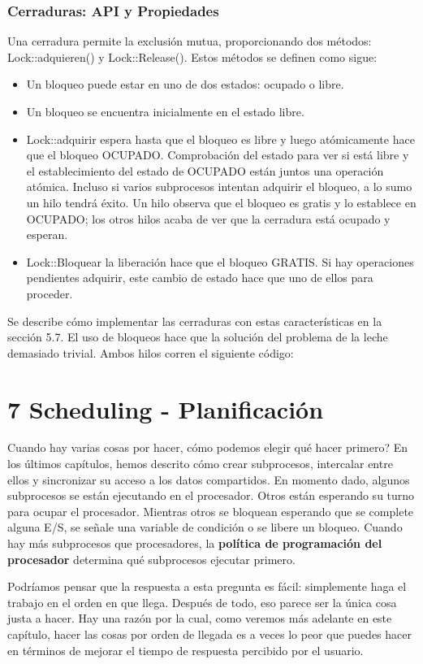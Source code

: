 \documentclass[10pt]{book}
\begin{document}
\subsection{Cerraduras: API y Propiedades}
Una cerradura permite la exclusión mutua, proporcionando dos métodos: Lock::adquieren() y Lock::Release(). Estos métodos se definen como sigue:
\begin{itemize}
\item Un bloqueo puede estar en uno de dos estados: ocupado o libre.
\item Un bloqueo se encuentra inicialmente en el estado libre.
\item Lock::adquirir espera hasta que el bloqueo es libre y luego atómicamente hace que el bloqueo OCUPADO. Comprobación del estado para ver si está libre y el establecimiento del estado de OCUPADO están juntos una operación atómica. Incluso si varios subprocesos intentan adquirir el bloqueo, a lo sumo un hilo tendrá éxito. Un hilo observa que el bloqueo es gratis y lo establece en OCUPADO; los otros hilos acaba de ver que la cerradura está ocupado y esperan.
\item Lock::Bloquear la liberación hace que el bloqueo GRATIS. Si hay operaciones pendientes adquirir, este cambio de estado hace que uno de ellos para proceder.
\end{itemize}

Se describe cómo implementar las cerraduras con estas características en la sección 5.7. El uso de bloqueos hace que la solución del problema de la leche demasiado trivial. Ambos hilos corren el siguiente código:


\chapter{ 7 Scheduling - Planificación}
Cuando hay varias cosas por hacer, cómo podemos elegir qué hacer primero? En los últimos capítulos, hemos descrito cómo crear subprocesos, intercalar entre ellos y sincronizar su acceso a los datos compartidos. En momento dado, algunos subprocesos se están ejecutando en el procesador. Otros están esperando su turno para ocupar el procesador. Mientras otros se bloquean esperando que se complete alguna E/S, se señale una variable de condición o se libere un bloqueo. Cuando hay más subprocesos que procesadores, la \textbf{política de programación del procesador} determina qué subprocesos ejecutar primero.

Podríamos pensar que la respuesta a esta pregunta es fácil: simplemente haga el trabajo en el orden en que llega. Después de todo, eso parece ser la única cosa justa a hacer. Hay una razón por la cual, como veremos más adelante en este capítulo, hacer las cosas por orden de llegada es a veces lo peor que puedes hacer en términos de mejorar el tiempo de respuesta percibido por el usuario.
\end{document}
